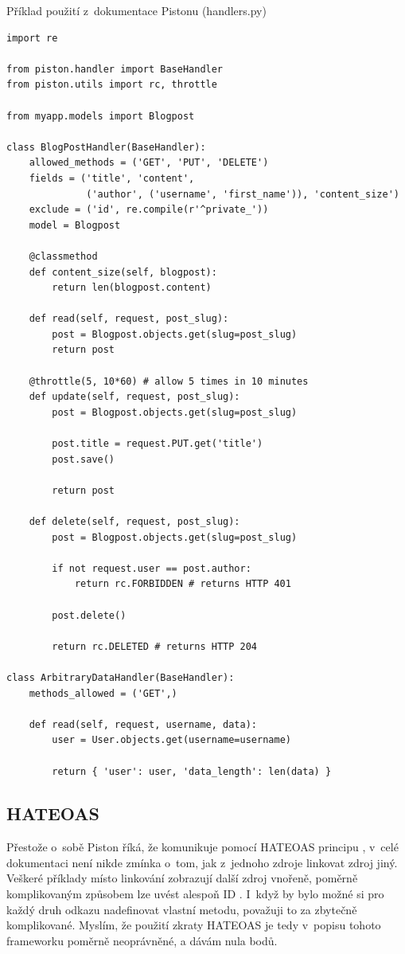 \begin{listing}[htbp]
\caption{{\label{code:piston2}Příklad použití z~dokumentace Pistonu (handlers.py) \autocite{piston}}}
\begin{verbatim}
import re

from piston.handler import BaseHandler
from piston.utils import rc, throttle

from myapp.models import Blogpost

class BlogPostHandler(BaseHandler):
    allowed_methods = ('GET', 'PUT', 'DELETE')
    fields = ('title', 'content',
              ('author', ('username', 'first_name')), 'content_size')
    exclude = ('id', re.compile(r'^private_'))
    model = Blogpost

    @classmethod
    def content_size(self, blogpost):
        return len(blogpost.content)

    def read(self, request, post_slug):
        post = Blogpost.objects.get(slug=post_slug)
        return post

    @throttle(5, 10*60) # allow 5 times in 10 minutes
    def update(self, request, post_slug):
        post = Blogpost.objects.get(slug=post_slug)

        post.title = request.PUT.get('title')
        post.save()

        return post

    def delete(self, request, post_slug):
        post = Blogpost.objects.get(slug=post_slug)

        if not request.user == post.author:
            return rc.FORBIDDEN # returns HTTP 401

        post.delete()

        return rc.DELETED # returns HTTP 204

class ArbitraryDataHandler(BaseHandler):
    methods_allowed = ('GET',)

    def read(self, request, username, data):
        user = User.objects.get(username=username)

        return { 'user': user, 'data_length': len(data) }
\end{verbatim}
\end{listing}

\subsection{HATEOAS}\label{hateoas}

Přestože o~sobě Piston říká, že komunikuje pomocí HATEOAS principu \autocite{piston}, v~celé dokumentaci není nikde zmínka o~tom, jak z~jednoho zdroje linkovat zdroj jiný. Veškeré příklady místo linkování zobrazují další zdroj vnořeně, poměrně komplikovaným způsobem lze uvést alespoň ID \autocite{pistonid}. I~když by bylo možné si pro každý druh odkazu nadefinovat vlastní metodu, považuji to za zbytečně komplikované. Myslím, že použití zkraty HATEOAS je tedy v~popisu tohoto frameworku poměrně neoprávněné, a dávám nula bodů.

